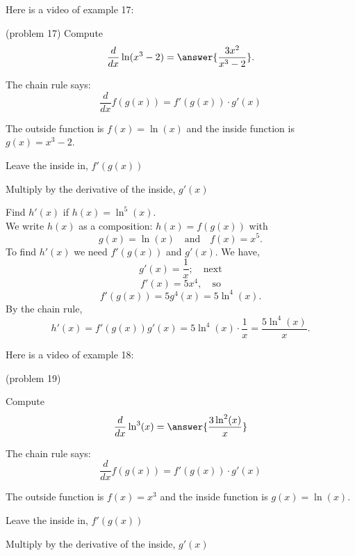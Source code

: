 \documentclass[handout]{ximera}
\begin{document}
Here is a video of example 17:
\begin{foldable}
\end{foldable}

 


\begin{problem}(problem 17)
  Compute
  \[
  \frac{d}{dx} \ln(x^3 -2) = \answer{\frac{3x^2}{x^3 - 2}}.
  \]
  
    \begin{hint}
      The chain rule says:
      \[
      \frac{d}{dx} f(g(x)) = f'(g(x))\cdot g'(x)
      \]
    \end{hint}
    \begin{hint}
      The outside function is $f(x) = \ln(x)$ and the inside
      function is $g(x) = x^3 - 2$.
    \end{hint}
    \begin{hint}
		  Leave the inside in, $f'(g(x))$
		\end{hint}
		\begin{hint}
		  Multiply by the derivative of the inside, $g'(x)$
		\end{hint}
		
\end{problem}



\begin{example}[example 18]
Find $h'(x)$ if $h(x) = \ln^5(x)$.\\
We write $h(x)$ as a composition: $h(x)=f(g(x))$ with 
\[g(x) = \ln(x)  \quad \text{and} \quad  f(x) = x^5.\]
 To find $h'(x)$ we need $f'(g(x))$ and $g'(x)$.  We have, 
\[g'(x) = \frac{1}{x}; \quad \text{next} \] 
\[f'(x) = 5x^4, \quad \text{so} \]
\[f'(g(x)) = 5g^4(x) = 5\ln^4(x).\]
By the chain rule,
\[h'(x) = f'(g(x))g'(x) = 5\ln^4(x)\cdot \frac{1}{x}  = \frac{5\ln^4(x)}{x}.\]
\end{example}

Here is a video of example 18:
\begin{foldable}
\end{foldable}



\begin{problem}(problem 19)
  
Compute
  \[
  \frac{d}{dx} \ln^3(x) = \answer{\frac{3\ln^2(x)}{x}}
  \]
  
    \begin{hint}
      The chain rule says:
      \[
      \frac{d}{dx} f(g(x)) = f'(g(x))\cdot g'(x)
      \]
    \end{hint}
    \begin{hint}
      The outside function is $f(x) = x^3$ and the inside
      function is $g(x) = \ln(x)$.
    \end{hint}
    \begin{hint}
		  Leave the inside in, $f'(g(x))$
		\end{hint}
		\begin{hint}
		  Multiply by the derivative of the inside, $g'(x)$
		\end{hint}
		
\end{problem}
\end{document}
